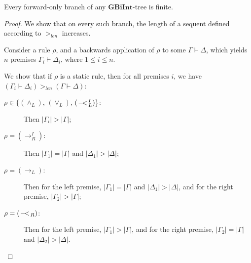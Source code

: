 \documentclass{llncs}
\numberwithin{equation}{section}
\newcommand{\ExAnd}{\wedge}
\newcommand{\ExOr}{\vee}
\newcommand{\sequent}{\vdash}
\newcommand{\Imp}{\rightarrow}
\newcommand{\WeakImp}{
\begin{picture}(10,10)
     \put(1,0){$-$}
     \put(7,0){$<$}
   \end{picture}
   \;\; 
}
\newcommand{\GBiInt}{\mathbf{GBiInt}}
\newcommand{\AndLeftRule}{(\ExAnd_L)}
\newcommand{\OrLeftRule}{(\ExOr_L)}
\newcommand{\ImpRightRuleI}{({\Imp_R^I})}
\newcommand{\ImpLeftAllRule}{(\Imp_{L})}
\newcommand{\WeakImpLeftRuleI}{({\WeakImp_L^I})}
\newcommand{\WeakImpRightAllRule}{(\WeakImp_{R})}
\begin{document}
\begin{lemma}\label{forwardOnlyFinite}
Every forward-only branch of any $\GBiInt$-tree is finite.
\end{lemma}
\begin{proof}
We show that on every such branch, the length of a sequent defined according to $>_{len}$ increases.

Consider a rule $\rho$, and a backwards application of $\rho$ to some $\Gamma \sequent \Delta$, which yields $n$ premises $\Gamma_i \sequent \Delta_i$, where $1 \leq i \leq n$.

We show that if $\rho$ is a static rule, then for all premises $i$, we have $(\Gamma_i \sequent \Delta_i) >_{len} (\Gamma \sequent \Delta)$:
\begin{description}
	\item[\rm{$\rho \in \{ \AndLeftRule$, $\OrLeftRule$, $\WeakImpLeftRuleI \}$:}] Then $|\Gamma_i| > |\Gamma|$;
	\item[\rm{$\rho = \ImpRightRuleI$:}] Then $|\Gamma_1| = |\Gamma|$ and $|\Delta_1| > |\Delta|$;	
	\item[\rm{$\rho = \ImpLeftAllRule$:}] Then for the left premise, $|\Gamma_1| = |\Gamma|$ and $|\Delta_1| > |\Delta|$, and for the right premise, $|\Gamma_2| > |\Gamma|$;
	\item[\rm{$\rho = \WeakImpRightAllRule$:}] Then for the left premise, $|\Gamma_1| > |\Gamma|$, and for the right premise, $|\Gamma_2| = |\Gamma|$ and $|\Delta_2| > |\Delta|$.
\end{description}


\end{proof}
\end{document}

